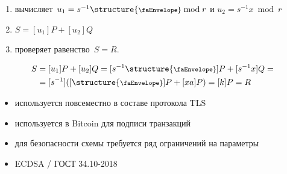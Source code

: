 \documentclass{beamer}
\begin{document}
	\begin{frame}
		\begin{enumerate}
			\item \structure{\faUserSecret} вычисляет~$u_1 = s^{-1} \text{\structure{\footnotesize\faEnvelope}} \bmod{r}$ и $u_2 = s^{-1} x \bmod{r}$
			\item $S = [u_1] P + [u_2] Q$
			\item проверяет равенство~$S = R$.
		\end{enumerate}
		
		\vspace{1em}
		\begin{align*}
			S &= 
			[u_1] P + [u_2] Q
			=%
			[s^{-1} \text{\structure{\footnotesize\faEnvelope}}] P + [s^{-1} x] Q 
			=\\&= [s^{-1}] ([\text{\structure{\footnotesize\faEnvelope}}] P + [x a] P)
			=%
			[k] P = R
		\end{align*}
		
		
	\end{frame}
	
	\begin{frame}{}
		\begin{itemize}
			\item используется повсеместно в составе протокола TLS
			\item используется в Bitcoin для подписи транзакций
			\item для безопасности схемы требуется ряд ограничений на параметры
			\item ECDSA / ГОСТ 34.10-2018
		\end{itemize}
	\end{frame}
	
\end{document}
